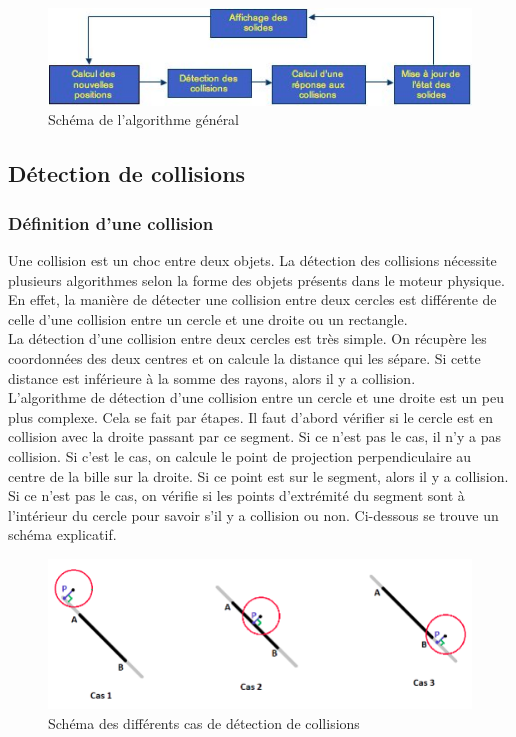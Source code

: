 \documentclass{report}
\begin{document}
\begin{figure}[H]
\centering
\includegraphics[scale=1.0]{algo_general.PNG}
\caption{Schéma de l'algorithme général}
\end{figure}

\subsection{Détection de collisions}

\subsubsection{Définition d'une collision}

Une collision est un choc entre deux objets. La détection des collisions nécessite plusieurs algorithmes selon la forme des objets présents dans le moteur physique. En effet, la manière de détecter une collision entre deux cercles est différente de celle d’une collision entre un cercle et une droite ou un rectangle. \\

La détection d’une collision entre deux cercles est très simple. On récupère les coordonnées des deux centres et on calcule la distance qui les sépare. Si cette distance est inférieure à la somme des rayons, alors il y a collision. \\

L’algorithme de détection d’une collision entre un cercle et une droite est un peu plus complexe. Cela se fait par étapes. Il faut d’abord vérifier si le cercle est en collision avec la droite passant par ce segment. Si ce n’est pas le cas, il n’y a pas collision. Si c’est le cas, on calcule le point de projection perpendiculaire au centre de la bille sur la droite. Si ce point est sur le segment, alors il y a collision. Si ce n’est pas le cas, on vérifie si les points d’extrémité du segment sont à l’intérieur du cercle pour savoir s’il y a collision ou non. Ci-dessous se trouve un schéma explicatif.

\begin{figure}[H]
\centering
\includegraphics[scale=1.0]{detect_collision.PNG}
\caption{Schéma des différents cas de détection de collisions}
\end{figure}
\end{document}
